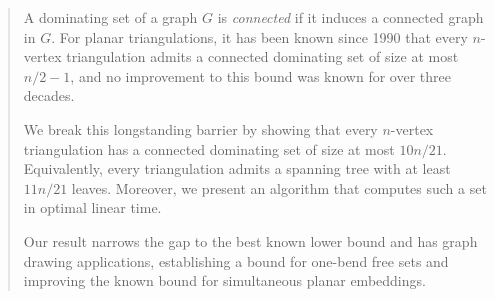 \documentclass[11pt]{article}
\newcommand{\R}{\mathbb{R}}
\theoremstyle{definition}
\newcommand{\vida}[1]{[{\color{pink}VD: #1}]}
\begin{document}
\begin{titlepage}
\begin{abstract}

A dominating set of a graph $G$ is \emph{connected} if it induces a connected graph in $G$. For planar triangulations, it has been known since 1990 that every $n$-vertex triangulation admits a connected dominating set of size at most $n/2 - 1$, and no improvement to this bound was known for over three decades.

We break this longstanding barrier by showing that every $n$-vertex triangulation has a connected dominating set of size at most $10n/21$. Equivalently, every triangulation admits a spanning tree with at least $11n/21$ leaves. Moreover, we present an algorithm that computes such a set in optimal linear time.

Our result narrows the gap to the best known lower bound and has graph drawing applications, establishing a bound for one-bend free sets and improving the known bound for simultaneous planar embeddings.


\newpage









  
  
  
\end{abstract}
\end{titlepage}
\end{document}
